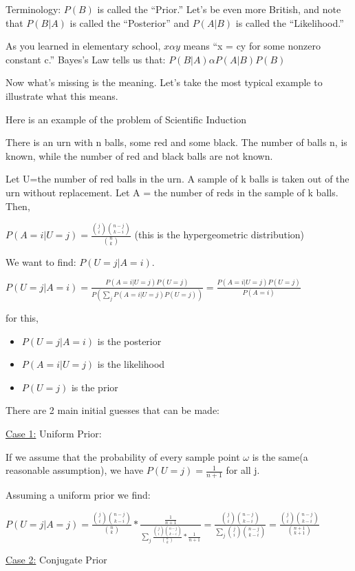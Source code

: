 Terminology:
$P(B)$ is called the ``Prior.''  Let's be even more British, and note that $P(B|A)$ is called the ``Posterior'' and $P(A|B)$ is called the ``Likelihood.''

As you learned in elementary school, $x\alpha y$ means ``x = cy for some nonzero constant c.''  Bayes's Law tells us that: $P(B|A)\alpha P(A|B)P(B)$

Now what's missing is the meaning. Let's take the most typical example to illustrate what this means.

Here is an example of the problem of Scientific Induction

There is an urn with n balls, some red and some black. The number of balls n, is known, while the number of red and black balls are not known.

Let U=the number of red balls in the urn.  A sample of k balls is taken out of the urn without replacement.  Let A = the number of reds in the sample of k balls.  Then,

$P(A=i|U=j)=\frac{{{{j}\choose{i}}{{n-j}\choose{k-i}}}}{{{n}\choose{k}}}$
(this is the hypergeometric distribution)

We want to find: $P(U=j|A=i)$.

$P(U=j|A=i)=\frac{P(A=i|U=j)P(U=j)}{P({{\sum_{j}P(A=i|U=j)P(U=j)}})}=\frac{
P(A=i|U=j)P(U=j)}{P(A=i)}$

for this,
\begin{itemize}
\item $P(U=j|A=i)$ is the posterior
\item $P(A=i|U=j)$ is the likelihood
\item $P(U=j)$ is the prior
\end{itemize}

There are 2 main initial guesses that can be made:

\underline{Case 1:}  Uniform Prior:

If we assume that the probability of every sample point $\omega$ is the
same(a reasonable assumption), we have $P(U=j)=\frac{1}{n+1}$ for all j.

Assuming a uniform prior we find:

$P(U=j|A=j)=\frac{{{{j}\choose{i}}{{n-j}\choose{k-i}}}}{{{n}\choose{k}}}*\frac{{\frac{1}{n+1}}}{{\sum_{j}\frac{{{{j}\choose{i}}{{n-j}\choose{k-i}}}}{{{n}\choose{k}}}*\frac{1}{n+1}}}=\frac{{{{j}\choose{i}}{{n-j}\choose{k-i}}}}{{\sum_{j}{{j}\choose{i}}{{n-j}\choose{k-i}}}}=\frac{{{{j}\choose{i}}{{n-j}\choose{k-i}}}}{{{n+1}\choose{k+1}}}$

\underline{Case 2:} Conjugate Prior


